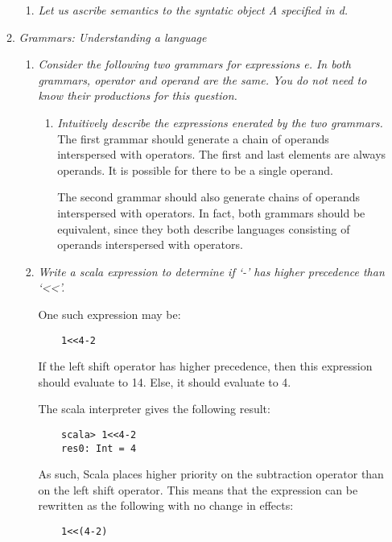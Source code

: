 \documentclass[12pt,letterpaper]{article}
\begin{document}
\begin{enumerate}
\begin{enumerate}
\begin{enumerate}
   \item \textit{Let us ascribe semantics to the syntatic object A specified in d.}
   
\end{enumerate}

\item \textit{Grammars: Understanding a language}
\begin{enumerate}
    \item \textit{Consider the following two grammars for expressions e. In both grammars, operator and operand are the same. You do not need to know their productions for this question.}
    \begin{enumerate}
        \item \textit{Intuitively describe the expressions enerated by the two grammars.}
        The first grammar should generate a chain of operands interspersed with operators. The first and last elements are always operands. It is possible for there to be a single operand.
        
        The second grammar should also generate chains of operands interspersed with operators. In fact, both grammars should be equivalent, since they both describe languages consisting of operands interspersed with operators.
    \end{enumerate}
    
    \item \textit{Write a scala expression to determine if `-' has higher precedence than `<<'. }
    
    One such expression may be:
    \begin{verbatim}
    1<<4-2
    \end{verbatim}
    
    If the left shift operator has higher precedence, then this expression should evaluate to 14. Else, it should evaluate to 4.
    
    The scala interpreter gives the following result: 
    \begin{verbatim}
    scala> 1<<4-2
    res0: Int = 4
    \end{verbatim}
    
    As such, Scala places higher priority on the subtraction operator than on the left shift operator. 
    This means that the expression can be rewritten as the following with no change in effects:
    
    \begin{verbatim}
    1<<(4-2)
    \end{verbatim}
    

\end{enumerate}
\end{enumerate}
\end{enumerate}
\end{document}
